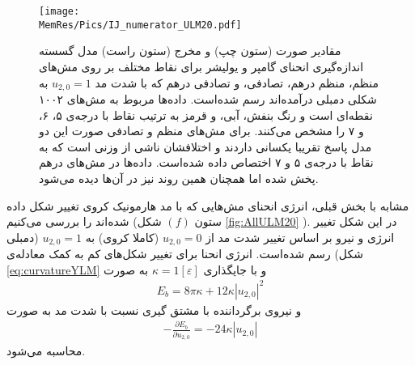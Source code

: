 
\begin{figure}[htbp]
\begin{center}
\texttt{[image: \\MemRes/Pics/IJ\_numerator\_ULM20.pdf]}
\caption{
مقادیر صورت (ستون چپ) و مخرج (ستون راست) مدل گسسته اندازه‌گیری انحنای گامپر و یولیشر برای نقاط مختلف بر روی مش‌های منظم، منظم درهم، تصادفی، و تصادفی درهم که با شدت مد 
$u_{2,0}=1$
به شکلی دمبلی درآمده‌اند رسم شده‌است. داده‌ها مربوط به مش‌های ۱۰۰۲ نقطه‌ای است و  رنگ بنفش، آبی، و قرمز به ترتیب  نقاط با درجه‌ی ۵، ۶، و ۷ را مشخص می‌کنند. برای مش‌های منظم و تصادفی صورت این دو مدل پاسخ تقریبا یکسانی داردند و اختلافشان ناشی از وزنی است که به نقاط با درجه‌ی ۵ و ۷ اختصاص داده شده‌است. داده‌ها در مش‌های درهم پخش شده اما همچنان همین روند نیز در آن‌ها دیده می‌شود.
}
\label{fig:ULM20BendingScatter}
\end{center}
\end{figure}

مشابه با بخش قبلی، انرژی انحنای مش‌هایی که با مد هارمونیک کروی تغییر شکل داده شده‌اند را بررسی می‌کنیم (ستون
$(f)$
شکل
\ref{fig:AllULM20}
). در این شکل تغییر انرژی و نیرو بر اساس تغییر شدت مد از
$u_{2,0}=0$
(کاملا کروی) به
$u_{2,0}=1$
(دمبلی شکل) رسم شده‌است. انرژی انحنا برای تغییر شکل‌های کم به کمک معادله‌ی 
\ref{eq:curvatureYLM}
 و با جایگذاری 
 $\kappa=1[\varepsilon]$
 به صورت
\begin{eqnarray}
E_{b}=8\pi\kappa + 12\kappa|u_{2,0}|^2
\label{eq:curvatureY20}
\end{eqnarray}
و نیروی برگرداننده با مشتق گیری نسبت با شدت مد به صورت
\begin{eqnarray}
-\frac{\partial E_{b}}{\partial u_{2,0}}= -24\kappa |u_{2,0}|
\label{eq:curvatureForceY20}
\end{eqnarray}
محاسبه می‌شود.


